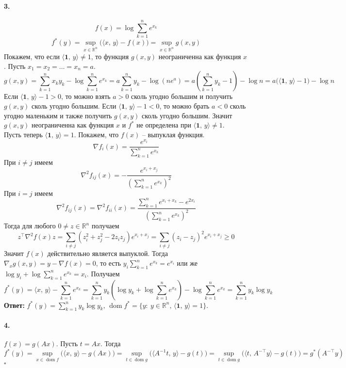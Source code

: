 \documentclass{article}
\DeclareMathOperator{\dom}{dom}
\newcommand*{\QED}{\null\nobreak\hfill\ensuremath{\square}}
\newcommand*{\R}{\mathbb{R}}
\begin{document}
\paragraph{3.}
\[ f(x) = \log \sum_{k = 1}^n e^{x_k} \]
\[ f^\ast(y) = \sup\limits_{x \in \R^n} \!\big( \langle x,\, y \rangle - f(x) \big) = \sup\limits_{x \in \R^n} g(x, y) \]
Покажем, что если $ \langle \mathbf{1},\, y \rangle \neq 1 $, то функция $g(x, y)$ неограниченна как функция $x$. Пусть $x_1 = x_2 = \dotsc = x_n = a$.
\[ g(x, y) = \sum_{k = 1}^n x_k y_k - \log \sum_{k = 1}^n e^{x_k} = a \sum_{k = 1}^n y_k - \log(n e^a) = a \left( \sum_{k = 1}^n y_k - 1 \right) - \log n = a \big( \langle \mathbf{1},\, y \rangle - 1 \big) - \log n \]
Если $\langle \mathbf{1},\, y \rangle - 1 > 0$, то можно взять $a > 0$ сколь угодно большим и получить $g(x, y)$ сколь угодно большим. Если $\langle \mathbf{1},\, y \rangle - 1 < 0$, то можно брать $a < 0$ сколь угодно маленьким и также получить $g(x, y)$ сколь угодно большим.
Значит $g(x, y)$ неограниченна как функция $x$ и $f^\ast$ не определена при $\langle \mathbf{1},\, y \rangle \neq 1$. \\
Пусть теперь $\langle \mathbf{1},\, y \rangle = 1$. Покажем, что $f(x)$ -- выпуклая функция. 
\[ \nabla f_i(x) = \frac{e^{x_i}}{\sum\limits_{k = 1}^n e^{x_k}} \]
При $i \neq j$ имеем
\[ \nabla^2 f_{ij}(x) = -\frac{e^{x_i + x_j}}{\left( \sum\limits_{k = 1}^n e^{x_k} \right)^2 } \]
При $i = j$ имеем
\[ \nabla^2 f_{ij}(x) = \nabla^2 f_{ii}(x) = \frac{\sum\limits_{k = 1}^n e^{x_i + x_k} - e^{2x_i}}{\left( \sum\limits_{k = 1}^n e^{x_k} \right)^2} \]
Тогда для любого $0 \neq z \in \R^n$ получаем
\[ z^\top \nabla^2 f(x) z = \sum\limits_{i \neq j} (z_i^2 + z_j^2 - 2 z_i z_j) e^{x_i + x_j} = \sum\limits_{i \neq j} (z_i - z_j)^2 e^{x_i + x_j} \geqslant 0 \]
Значит $f(x)$ действительно является выпуклой. Тогда $ \nabla_x g(x, y) = y - \nabla f(x) = 0 $, то есть $ y_i \sum\limits_{k = 1}^n e^{x_k} = e^{x_i} $ или же $\log y_i + \log \sum\limits_{k = 1}^n e^{x_k} = x_i$. Получаем
\[ f^\ast(y) = \langle x,\, y \rangle - \sum\limits_{k = 1}^n e^{x_k} = \sum\limits_{k = 1}^n y_k \left( \log y_k + \log \sum\limits_{k = 1}^n e^{x_k} \right) - \log\sum\limits_{k = 1}^n e^{x_k} = \sum\limits_{k = 1}^n y_k \log y_k \]
\textbf{Ответ:} $ f^\ast(y) = \sum\limits_{k = 1}^n y_k \log y_k,\, \dom f^\ast = \{ y :\: y \in \R^n,\, \langle \mathbf{1},\, y \rangle = 1 \} $.


\paragraph{4.} $ f(x) = g(Ax) $. Пусть $t = Ax$. Тогда 
\[ f^\ast(y) = \sup\limits_{x \in \dom f}\big( \langle x,\, y \rangle - g(Ax) \big) = \sup\limits_{t \in \dom g} \big( \langle A^{-1} t,\, y \rangle - g(t) \big) = \sup\limits_{t \in \dom g} \big( \langle t,\, A^{-\top}y \rangle - g(t) \big) = g^\ast\!\left(A^{-\top}y\right) \] \QED
\end{document}
